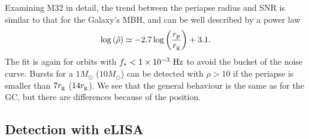 Examining M32 in detail, the trend between the periapse radius and SNR is similar to that for the Galaxy's MBH, and can be well described by a power law
\begin{equation}
\log\left(\hat{\rho}\right) \simeq -2.7\log\left(\frac{r_\mathrm{p}}{r_\mathrm{g}}\right) + 3.1.
\end{equation}
The fit is again for orbits with $f_\ast < 1 \times 10^{-3}~\mathrm{Hz}$ to avoid the bucket of the noise curve. Bursts for a $1 M_\odot$ ($10 M_\odot$) can be detected with $\rho > 10$ if the periapse is smaller than $7 r_\mathrm{g}$ ($14 r_\mathrm{g}$). We see that the general behaviour is the same as for the GC, but there are differences because of the position.

\subsection{Detection with eLISA}

